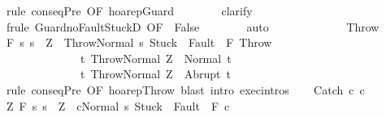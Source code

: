 \begin{isabellebody}
\ {\isacharparenleft}rule\ conseqPre\ {\isacharbrackleft}OF\ hoarep{\isachardot}Guard{\isacharbrackright}{\isacharparenright}\isanewline
\ \ \ \ \ \ \isamarkupfalse%
\ clarify\isanewline
\ \ \ \ \ \ \isamarkupfalse%
\ {\isacharparenleft}frule\ Guard{\isacharunderscore}noFaultStuckD\ {\isacharbrackleft}OF\ {\isacharunderscore}\ False{\isacharbrackright}{\isacharparenright}\isanewline
\ \ \ \ \ \ \isamarkupfalse%
\ auto\isanewline
\ \ \ \ \ \ \isamarkupfalse%
\isanewline
\ \ \isamarkupfalse%
\isanewline
{}\isamarkupfalse%
\isanewline
\ \ \isamarkupfalse%
\ Throw\isanewline
\ \ \isamarkupfalse%
\ {\isachardoublequoteopen}{\isasymGamma}{\isacharcomma}{\isasymTheta}{\isasymturnstile}\isactrlbsub {\isacharslash}F\isactrlesub \ {\isacharbraceleft}s{\isachardot}\ s\ {\isacharequal}\ Z\ {\isasymand}\ {\isasymGamma}{\isasymturnstile}{\isasymlangle}Throw{\isacharcomma}Normal\ s{\isasymrangle}\ {\isasymRightarrow}{\isasymnotin}{\isacharparenleft}{\isacharbraceleft}Stuck{\isacharbraceright}\ {\isasymunion}\ Fault\ {\isacharbackquote}\ {\isacharparenleft}{\isacharminus}F{\isacharparenright}{\isacharparenright}{\isacharbraceright}\ Throw\isanewline
\ \ \ \ \ \ \ \ \ \ \ \ \ \ {\isacharbraceleft}t{\isachardot}\ {\isasymGamma}{\isasymturnstile}{\isasymlangle}Throw{\isacharcomma}Normal\ Z{\isasymrangle}\ {\isasymRightarrow}\ Normal\ t{\isacharbraceright}{\isacharcomma}\isanewline
\ \ \ \ \ \ \ \ \ \ \ \ \ \ {\isacharbraceleft}t{\isachardot}\ {\isasymGamma}{\isasymturnstile}{\isasymlangle}Throw{\isacharcomma}Normal\ Z{\isasymrangle}\ {\isasymRightarrow}\ Abrupt\ t{\isacharbraceright}{\isachardoublequoteclose}\isanewline
\ \ \ \ \isamarkupfalse%
\ {\isacharparenleft}rule\ conseqPre\ {\isacharbrackleft}OF\ hoarep{\isachardot}Throw{\isacharbrackright}{\isacharparenright}\ {\isacharparenleft}blast\ intro{\isacharcolon}\ exec{\isachardot}intros{\isacharparenright}\isanewline
{}\isamarkupfalse%
\isanewline
\ \ \isamarkupfalse%
\ {\isacharparenleft}Catch\ c\ c\isanewline
\ \ \isamarkupfalse%
\ {\isachardoublequoteopen}{\isasymforall}Z{\isachardot}\ {\isasymGamma}{\isacharcomma}{\isasymTheta}{\isasymturnstile}\isactrlbsub {\isacharslash}F\isactrlesub \ {\isacharbraceleft}s{\isachardot}\ s\ {\isacharequal}\ Z\ {\isasymand}\ {\isasymGamma}{\isasymturnstile}{\isasymlangle}cNormal\ s{\isasymrangle}\ {\isasymRightarrow}{\isasymnotin}{\isacharparenleft}{\isacharbraceleft}Stuck{\isacharbraceright}\ {\isasymunion}\ Fault\ {\isacharbackquote}\ {\isacharparenleft}{\isacharminus}F{\isacharparenright}{\isacharparenright}{\isacharbraceright}\ c\isanewline

\end{isabellebody}
